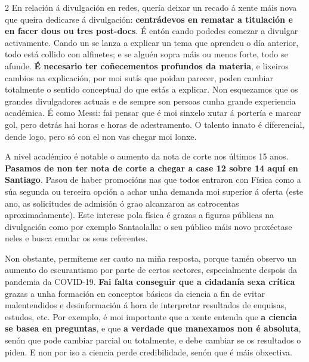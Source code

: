 \begin{multicols}{2}
En relación á divulgación en redes, quería deixar un recado á xente máis nova
que queira dedicarse á divulgación: \textbf{centrádevos en rematar a titulación
e en facer dous ou tres post-docs}. É entón cando podedes comezar a divulgar
activamente. Cando un se lanza a explicar un tema que aprendeu o día anterior,
todo está collido con alfinetes; e se alguén sopra máis ou menos forte, todo se
afunde. \textbf{É necesario ter coñecementos profundos da materia}, e lixeiros
cambios na explicación, por moi sutís que poidan parecer, poden cambiar
totalmente o sentido conceptual do que estás a explicar. Non esquezamos que os
grandes divulgadores actuais e de sempre son persoas cunha grande experiencia
académica. É como Messi: fai pensar que é moi sinxelo xutar á portería e marcar
gol, pero detrás hai horas e horas de adestramento. O talento innato é
diferencial, dende logo, pero só con el non vas chegar moi lonxe.





A nivel académico é notable o aumento da nota de corte nos últimos 15 anos.
\textbf{Pasamos de non ter nota de corte a chegar a case 12 sobre 14 aquí en
Santiago}. Pasou de haber promocións nas que todos entraron con Física como a
súa segunda ou terceira opción a achar unha demanda moi superior á oferta (este
ano, as solicitudes de admisión ó grao alcanzaron as catrocentas
aproximadamente). Este interese pola física é grazas a figuras públicas na
divulgación como por exemplo Santaolalla: o seu público máis novo proxéctase
neles e busca emular os seus referentes.

Non obstante, permíteme ser cauto na miña resposta, porque tamén observo un
aumento do escurantismo por parte de certos sectores, especialmente despois da
pandemia da COVID-19. \textbf{Fai falta conseguir que a cidadanía sexa crítica}
grazas a unha formación en conceptos básicos da ciencia a fin de evitar
malentendidos e desinformación á hora de interpretar resultados de enquisas,
estudos, etc. Por exemplo, é moi importante que a xente entenda que \textbf{a
ciencia se basea en preguntas}, e que \textbf{a verdade que manexamos non é
absoluta}, senón que pode cambiar parcial ou totalmente, e debe cambiar se os
resultados o piden. E non por iso a ciencia perde credibilidade, senón que é
máis obxectiva.



\end{multicols}
